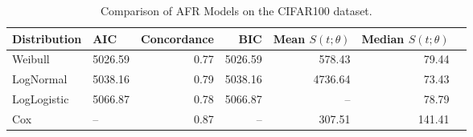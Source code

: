 \begin{table*}
\centering
\caption{Comparison of AFR Models on the CIFAR100 dataset.}
\label{tab:cifar100}
\begin{tabular}{llrrrrr}
\toprule
Distribution &     AIC &  Concordance &     BIC &  Mean  $S(t; \theta)$ &  Median $S(t; \theta)$ \\
\midrule
Weibull & 5026.59 &         0.77 & 5026.59 &              578.43 &                 79.44 \\
LogNormal & 5038.16 &         0.79 & 5038.16 &             4736.64 &                 73.43 \\
LogLogistic & 5066.87 &         0.78 & 5066.87 &                 -- &                 78.79 \\
Cox &     -- &         0.87 &     -- &              307.51 &                141.41 \\
\bottomrule
\end{tabular}
\end{table*}
